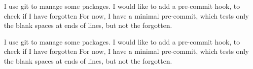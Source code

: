 \documentclass{book}
\begin{document}
\begin{pairs}
\begin{Rightside}
\pstart
{}
\pend

\pstart
{}
\pend

\pstart
{}
\pend

\pstart
I use git to manage some packages.
I would like to add a pre-commit hook, to check if I have forgotten
For now, I have a minimal pre-commit, which tests only the blank spaces at ends of lines, but not the forgotten.
\pend

\pstart
{}
\pend

\pstart
I use git to manage some packages.
I would like to add a pre-commit hook, to check if I have forgotten
For now, I have a minimal pre-commit, which tests only the blank spaces at ends of lines, but not the forgotten.
\pend

\endnumbering

\end{Rightside}

\end{pairs}
\Columns
\end{document}
